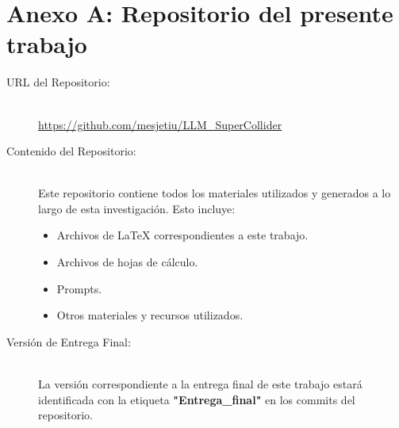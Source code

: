 \chapter*{Anexo A: Repositorio del presente trabajo}

\begin{center}
\end{center}

\begin{description}
    \item[URL del Repositorio:] \hfill \\
    \url{https://github.com/mesjetiu/LLM_SuperCollider}
    
    \item[Contenido del Repositorio:] \hfill \\
    Este repositorio contiene todos los materiales utilizados y generados a lo largo de esta investigación. Esto incluye:
    \begin{itemize}
        \item Archivos de \LaTeX{} correspondientes a este trabajo.
        \item Archivos de hojas de cálculo.
        \item Prompts.
        \item Otros materiales y recursos utilizados.
    \end{itemize}
    
    \item[Versión de Entrega Final:] \hfill \\
    La versión correspondiente a la entrega final de este trabajo estará identificada con la etiqueta \textbf{"Entrega\_final"} en los commits del repositorio.
\end{description}

